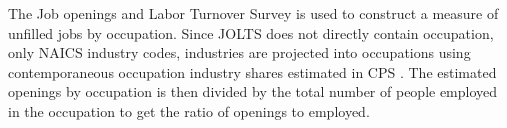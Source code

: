 \documentclass[12pt]{article}
\begin{document}










The Job openings and Labor Turnover Survey \cite{JOLTS} is used to construct a measure of unfilled jobs by occupation. Since JOLTS does not directly contain occupation, only NAICS industry codes, industries are projected into occupations using contemporaneous occupation industry shares estimated in CPS \cite{IPUMSCPS}. The estimated openings by occupation is then divided by the total number of people employed in the occupation to get the ratio of openings to employed.

\end{document}
